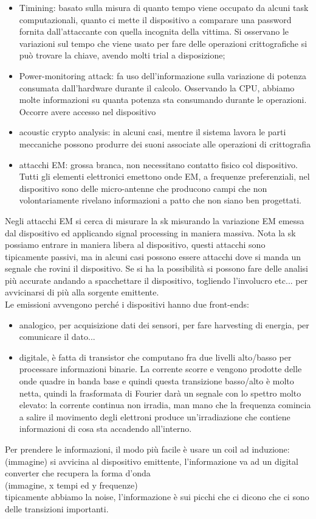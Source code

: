 \documentclass[oneside, 12pt]{extbook}
\begin{document}
\begin{itemize}
	\item Timining: basato sulla misura di quanto tempo viene occupato da alcuni task computazionali, quanto ci mette il dispositivo a comparare una password fornita dall'attaccante con quella incognita della vittima. Si osservano le variazioni sul tempo che viene usato per fare delle operazioni crittografiche si può trovare la chiave, avendo molti trial a disposizione;
	\item Power-monitoring attack: fa uso dell'informazione sulla variazione di potenza consumata dall'hardware durante il calcolo. Osservando la CPU, abbiamo molte informazioni su quanta potenza sta consumando durante le operazioni. Occorre avere accesso nel dispositivo
	\item acoustic crypto analysis: in alcuni casi, mentre il sistema lavora le parti meccaniche possono produrre dei suoni associate alle operazioni di crittografia
	\item attacchi EM: grossa branca, non necessitano contatto fisico col dispositivo. Tutti gli elementi elettronici emettono onde EM, a frequenze preferenziali, nel dispositivo sono delle micro-antenne che producono campi che non volontariamente rivelano informazioni a patto che non siano ben progettati.
\end{itemize}
Negli attacchi EM si cerca di misurare la sk misurando la variazione EM emessa dal dispositivo ed applicando signal processing in maniera massiva. Nota la sk possiamo entrare in maniera libera al dispositivo, questi attacchi sono tipicamente passivi, ma in alcuni casi possono essere attacchi dove si manda un segnale che rovini il dispositivo. Se si ha la possibilità si possono fare delle analisi più accurate andando a spacchettare il dispositivo, togliendo l'involucro etc... per avvicinarsi di più alla sorgente emittente.\\Le emissioni avvengono perché i dispositivi hanno due front-ends:
\begin{itemize}
	\item analogico, per acquisizione dati dei sensori, per fare harvesting di energia, per comunicare il dato...
	\item digitale, è fatta di transistor che computano fra due livelli alto/basso per processare informazioni binarie. La corrente scorre e vengono prodotte delle onde quadre in banda base e quindi questa transizione basso/alto è molto netta, quindi la frasformata di Fourier darà un segnale con lo spettro molto elevato: la corrente continua non irradia, man mano che la frequenza comincia a salire il movimento degli elettroni produce un'irradiazione che contiene informazioni di cosa sta accadendo all'interno.
\end{itemize}
Per prendere le informazioni, il modo più facile è usare un coil ad induzione: (immagine) si avvicina al dispositivo emittente, l'informazione va ad un digital converter che recupera la forma d'onda \\(immagine, x tempi ed y frequenze)\\tipicamente abbiamo la noise, l'informazione è sui picchi che ci dicono che ci sono delle transizioni importanti.
\end{document}
